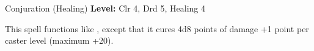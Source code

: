 {Conjuration (Healing)}
{
	\textbf{Level:}
	Clr 4, Drd 5, Healing 4\\
}
{
	This spell functions like , except that it cures 4d8 points of damage +1 point per caster level (maximum +20).

}
